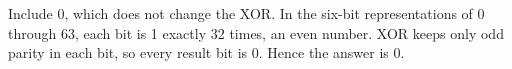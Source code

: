Include 0, which does not change the XOR. In the six-bit representations of 0 through 63, each bit is 1 exactly 32 times, an even number. XOR keeps only odd parity in each bit, so every result bit is 0. Hence the answer is $\boxed0$.

